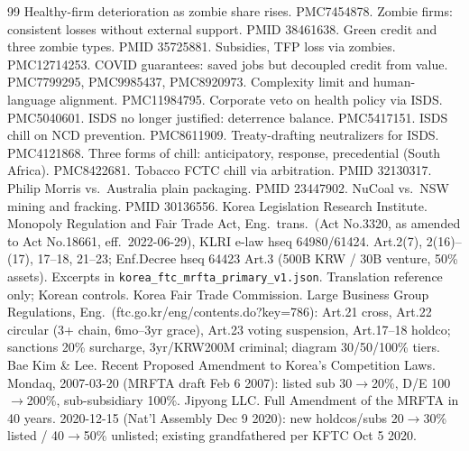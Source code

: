 \documentclass[11pt]{article}
\begin{document}
\begin{thebibliography}{99}
 Healthy-firm deterioration as zombie share rises. PMC7454878.
 Zombie firms: consistent losses without external support. PMID 38461638.
 Green credit and three zombie types. PMID 35725881.
 Subsidies, TFP loss via zombies. PMC12714253.
 COVID guarantees: saved jobs but decoupled credit from value. PMC7799295, PMC9985437, PMC8920973.
 Complexity limit and human-language alignment. PMC11984795.
 Corporate veto on health policy via ISDS. PMC5040601.
 ISDS no longer justified: deterrence balance. PMC5417151.
 ISDS chill on NCD prevention. PMC8611909.
 Treaty-drafting neutralizers for ISDS. PMC4121868.
 Three forms of chill: anticipatory, response, precedential (South Africa). PMC8422681.
 Tobacco FCTC chill via arbitration. PMID 32130317.
 Philip Morris vs.\ Australia plain packaging. PMID 23447902.
 NuCoal vs.\ NSW mining and fracking. PMID 30136556.
 Korea Legislation Research Institute. Monopoly Regulation and Fair Trade Act, Eng.\ trans.\ (Act No.3320, as amended to Act No.18661, eff.\ 2022-06-29), KLRI e-law hseq 64980/61424. Art.2(7), 2(16)--(17), 17--18, 21--23; Enf.Decree hseq 64423 Art.3 (500B KRW / 30B venture, 50\% assets). Excerpts in \texttt{korea\_ftc\_mrfta\_primary\_v1.json}. Translation reference only; Korean controls.
 Korea Fair Trade Commission. Large Business Group Regulations, Eng.\ (ftc.go.kr/eng/contents.do?key=786): Art.21 cross, Art.22 circular (3+ chain, 6mo--3yr grace), Art.23 voting suspension, Art.17--18 holdco; sanctions 20\% surcharge, 3yr/KRW200M criminal; diagram 30/50/100\% tiers.
 Bae Kim \& Lee. Recent Proposed Amendment to Korea's Competition Laws. Mondaq, 2007-03-20 (MRFTA draft Feb 6 2007): listed sub 30$\to$20\%, D/E 100$\to$200\%, sub-subsidiary 100\%.
 Jipyong LLC. Full Amendment of the MRFTA in 40 years. 2020-12-15 (Nat'l Assembly Dec 9 2020): new holdcos/subs 20$\to$30\% listed / 40$\to$50\% unlisted; existing grandfathered per KFTC Oct 5 2020.

\end{thebibliography}
\end{document}
